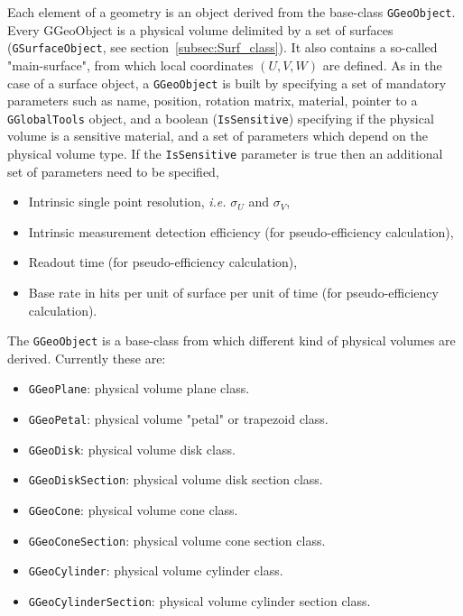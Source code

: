 Each element of a geometry is an object derived from the base-class {\tt GGeoObject}. Every GGeoObject is a physical volume delimited by a set of surfaces ({\tt GSurfaceObject}, 
see section~\ref{subsec:Surf_class}). It also contains a so-called "main-surface", from which local coordinates $(U,V,W)$ are defined. As in the case of a surface object, a 
{\tt GGeoObject} is built by specifying a set of mandatory parameters such as name, position, rotation matrix, material, pointer to a {\tt GGlobalTools} object, and a boolean 
({\tt IsSensitive}) specifying if the physical volume is a sensitive material, and a set of parameters which depend on the physical volume type. If the {\tt IsSensitive} parameter 
is true then an additional set of parameters need to be specified,

\begin{itemize}
  \item  Intrinsic single point resolution, {\it i.e.} $\sigma_U$ and $\sigma_V$,
  
  \item  Intrinsic measurement detection efficiency (for pseudo-efficiency calculation),
  
  \item  Readout time (for pseudo-efficiency calculation),
  
  \item  Base rate in hits per unit of surface per unit of time (for pseudo-efficiency calculation).
\end{itemize}

The {\tt GGeoObject} is a base-class from which different kind of physical volumes are derived. Currently these are:

\begin{itemize}
  \item  {\tt GGeoPlane}: physical volume plane class.
  
  \item  {\tt GGeoPetal}: physical volume "petal" or trapezoid class.
  
  \item  {\tt GGeoDisk}: physical volume disk class.
  
  \item  {\tt GGeoDiskSection}: physical volume disk section class.
  
  \item  {\tt GGeoCone}: physical volume cone class.
  
  \item  {\tt GGeoConeSection}: physical volume cone section class.
  
  \item  {\tt GGeoCylinder}: physical volume cylinder class.
  
  \item  {\tt GGeoCylinderSection}: physical volume cylinder section class.
\end{itemize}


